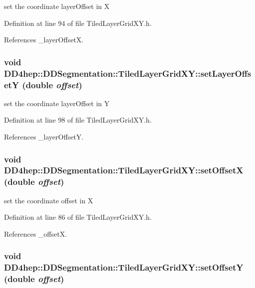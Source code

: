 set the coordinate layerOffset in X 

Definition at line 94 of file TiledLayerGridXY.h.

References \_\-layerOffsetX.\hypertarget{class_d_d4hep_1_1_d_d_segmentation_1_1_tiled_layer_grid_x_y_a280670f55a514e9f6f373bef61832ad0}{
\subsubsection[{setLayerOffsetY}]{\setlength{\rightskip}{0pt plus 5cm}void DD4hep::DDSegmentation::TiledLayerGridXY::setLayerOffsetY (double {\em offset})}}
\label{class_d_d4hep_1_1_d_d_segmentation_1_1_tiled_layer_grid_x_y_a280670f55a514e9f6f373bef61832ad0}


set the coordinate layerOffset in Y 

Definition at line 98 of file TiledLayerGridXY.h.

References \_\-layerOffsetY.\hypertarget{class_d_d4hep_1_1_d_d_segmentation_1_1_tiled_layer_grid_x_y_a19c0059402e512da58c2d241d8e67de7}{
\subsubsection[{setOffsetX}]{\setlength{\rightskip}{0pt plus 5cm}void DD4hep::DDSegmentation::TiledLayerGridXY::setOffsetX (double {\em offset})}}
\label{class_d_d4hep_1_1_d_d_segmentation_1_1_tiled_layer_grid_x_y_a19c0059402e512da58c2d241d8e67de7}


set the coordinate offset in X 

Definition at line 86 of file TiledLayerGridXY.h.

References \_\-offsetX.\hypertarget{class_d_d4hep_1_1_d_d_segmentation_1_1_tiled_layer_grid_x_y_a588e04b48f59f73af89b54302e3eb025}{
\subsubsection[{setOffsetY}]{\setlength{\rightskip}{0pt plus 5cm}void DD4hep::DDSegmentation::TiledLayerGridXY::setOffsetY (double {\em offset})}}
\label{class_d_d4hep_1_1_d_d_segmentation_1_1_tiled_layer_grid_x_y_a588e04b48f59f73af89b54302e3eb025}


